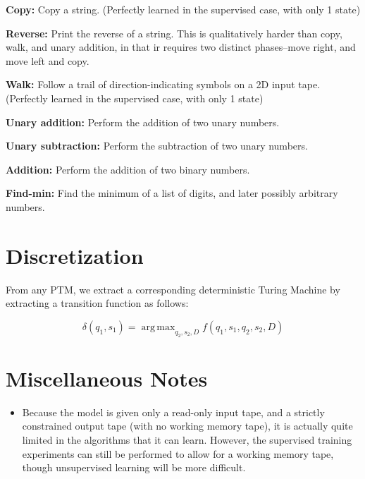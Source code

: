 \documentclass{article}
\DeclareMathOperator*{\argmax}{arg\,max}
\begin{document}
\textbf{Copy:} Copy a string. (Perfectly learned in the supervised case, with only 1 state)

\textbf{Reverse:} Print the reverse of a string. This is qualitatively harder than copy, walk, and unary addition, in that ir requires two distinct phases--move right, and move left and copy. 

\textbf{Walk:} Follow a trail of direction-indicating symbols on a 2D input tape. (Perfectly learned in the supervised case, with only 1 state)

\textbf{Unary addition:} Perform the addition of two unary numbers.

\textbf{Unary subtraction:} Perform the subtraction of two unary numbers.

\textbf{Addition:} Perform the addition of two binary numbers.

\textbf{Find-min:} Find the minimum of a list of digits, and later possibly arbitrary numbers.

\section{Discretization}
From any PTM, we extract a corresponding deterministic Turing Machine by extracting a transition function as follows:

\[ \delta(q_1, s_1) = \argmax_{q_2, s_2, D}f(q_1, s_1, q_2, s_2, D) \]

\section{Miscellaneous Notes}
\begin{itemize}
    \item Because the model is given only a read-only input tape, and a strictly constrained output tape (with no working memory tape), it is actually quite limited in the algorithms that it can learn. However, the supervised training experiments can still be performed to allow for a working memory tape, though unsupervised learning will be more difficult.
\end{itemize}
\end{document}
